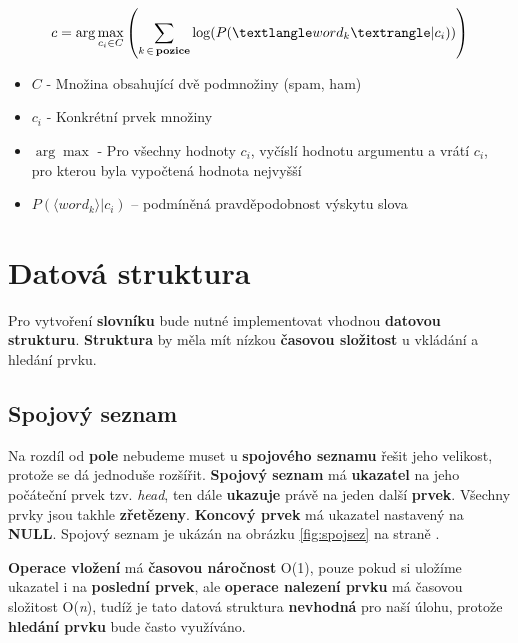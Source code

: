 \documentclass[12pt]{report}
\begin{document}
		\clearpage
	
		\begin{equation}\label{Eq:vzorec}
			c = \arg\max_{c_i \in C} \left( \sum_{k\,\in\,\text{\bfseries pozice}} \log (P(⟨word_{k}⟩|c_{i})) \right)
		\end{equation}
	
	
	\begin{itemize}
		\item $C$ - Množina obsahující dvě podmnožiny (spam, ham)
		\item $c_i$ - Konkrétní prvek množiny
		\item $\arg\max$ - Pro všechny hodnoty $c_i$, vyčíslí hodnotu argumentu a vrátí $c_i$, pro kterou byla vypočtená hodnota nejvyšší
		\item $P(⟨word_{k}⟩|c_{i})$ – podmíněná pravděpodobnost výskytu slova
	\end{itemize}


	\section{Datová struktura}
	
	Pro vytvoření \textbf{slovníku} bude nutné implementovat vhodnou \textbf{datovou strukturu}. \textbf{Struktura} by měla mít nízkou \textbf{časovou složitost} u vkládání a hledání prvku.
	
		\subsection{Spojový seznam}
		
		Na rozdíl od \textbf{pole} nebudeme muset u \textbf{spojového seznamu} řešit jeho velikost, protože se dá jednoduše rozšířit. \textbf{Spojový seznam} má \textbf{ukazatel} na jeho počáteční prvek tzv. \textit{head}, ten dále \textbf{ukazuje} právě na jeden další \textbf{prvek}. Všechny prvky jsou takhle \textbf{zřetězeny}. \textbf{Koncový prvek} má ukazatel nastavený na \textbf{NULL}. Spojový seznam je ukázán na obrázku \ref{fig:spojsez} na straně \pageref{fig:spojsez}. 
		
		\textbf{Operace vložení} má \textbf{časovou náročnost} O(1), pouze pokud si uložíme ukazatel i na \textbf{poslední prvek}, ale \textbf{operace nalezení prvku} má časovou složitost O(\textit{n}), tudíž je tato datová struktura \textbf{nevhodná} pro naší úlohu, protože \textbf{hledání prvku} bude často využíváno.
		
\end{document}
